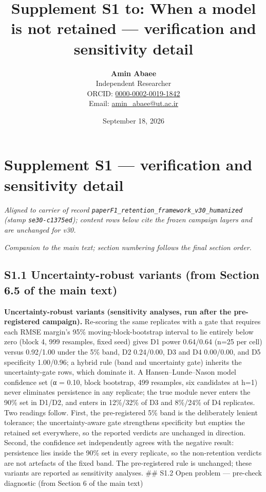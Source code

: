 \documentclass[11pt]{article}
\title{Supplement S1 to: When a model is not retained — verification and sensitivity detail}
\author{\textbf{Amin Abaee}\\ Independent Researcher\\[2pt] ORCID: \href{https://orcid.org/0000-0002-0019-1842}{0000-0002-0019-1842}\\ Email: \href{mailto:amin_abaee@ut.ac.ir}{amin_abaee@ut.ac.ir}}
\date{September 18, 2026}
\begin{document}
\maketitle

\section{Supplement S1 --- verification and sensitivity
detail}\label{supplement-s1-verification-and-sensitivity-detail}

\emph{Aligned to carrier of record
\texttt{paperF1\_retention\_framework\_v30\_humanized} (stamp
\texttt{se30-c1375ed}); content rows below cite the frozen campaign
layers and are unchanged for v30.}

\emph{Companion to the main text; section numbering follows the final
section order.}

\subsection{S1.1 Uncertainty-robust variants (from Section 6.5 of the
main
text)}\label{s1.1-uncertainty-robust-variants-from-section-6.5-of-the-main-text}

\textbf{Uncertainty-robust variants (sensitivity analyses, run after the
pre-registered campaign).} Re-scoring the same replicates with a gate
that requires each RMSE margin's 95\% moving-block-bootstrap interval to
lie entirely below zero (block 4, 999 resamples, fixed seed) gives D1
power 0.64/0.64 (n=25 per cell) versus 0.92/1.00 under the 5\% band, D2
0.24/0.00, D3 and D4 0.00/0.00, and D5 specificity 1.00/0.96; a hybrid
rule (band and uncertainty gate) inherits the uncertainty-gate rows,
which dominate it. A Hansen--Lunde--Nason model confidence set (α =
0.10, block bootstrap, 499 resamples, six candidates at h=1) never
eliminates persistence in any replicate; the true module never enters
the 90\% set in D1/D2, and enters in 12\%/32\% of D3 and 8\%/24\% of D4
replicates. Two readings follow. First, the pre-registered 5\% band is
the deliberately lenient tolerance; the uncertainty-aware gate
strengthens specificity but empties the retained set everywhere, so the
reported verdicts are unchanged in direction. Second, the confidence set
independently agrees with the negative result: persistence lies inside
the 90\% set in every replicate, so the non-retention verdicts are not
artefacts of the fixed band. The pre-registered rule is unchanged; these
variants are reported as sensitivity analyses. \#\# S1.2 Open problem
--- pre-check diagnostic (from Section 6 of the main text)
\end{document}
